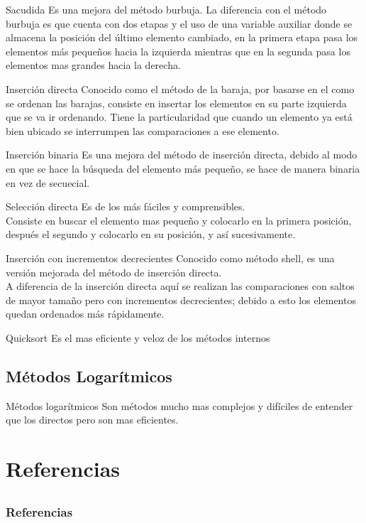 \documentclass{beamer}
\begin{document}
\begin{frame}{Sacudida}
	Es una mejora del m\'etodo burbuja. La diferencia con el m\'etodo burbuja es que cuenta con dos etapas y el uso de una variable auxiliar donde se almacena la posici\'on 
	del \'ultimo elemento cambiado, en la primera etapa pasa los elementos m\'as pequeños hacia
	la izquierda mientras que en la segunda pasa los elementos mas grandes hacia la derecha. 
\end{frame}

\begin{frame}{Inserci\'on directa}
	Conocido como el m\'etodo de la baraja, por basarse en el como se ordenan las barajas, consiste en insertar los elementos en su parte izquierda que se va ir ordenando.
	Tiene la particularidad que cuando un elemento ya est\'a bien ubicado se interrumpen las comparaciones a ese elemento.
\end{frame}

\begin{frame}{Inserci\'on binaria}
	Es una mejora del m\'etodo de inserci\'on directa, debido al modo en que se hace la b\'usqueda del elemento m\'as pequeño, se hace de manera binaria en vez de secuecial.
\end{frame}

\begin{frame}{Selecci\'on directa}
	Es de los m\'as f\'aciles y comprensibles.\\
	Consiste en buscar el elemento mas pequeño y colocarlo en la primera posici\'on, despu\'es el segundo y colocarlo en su posici\'on, y as\'i sucesivamente.
\end{frame}

\begin{frame}{Inserci\'on con incrementos decrecientes}
	Conocido como m\'etodo shell, es una versi\'on mejorada del m\'etodo de inserci\'on directa.\\
	A diferencia de la inserci\'on directa aqu\'i se realizan las comparaciones con saltos de mayor tamaño pero con incrementos decrecientes; debido a esto los elementos quedan ordenados m\'as r\'apidamente.
\end{frame}

\begin{frame}{Quicksort}
	Es el mas eficiente y veloz de los m\'etodos internos
\end{frame}

\subsection{M\'etodos Logar\'itmicos}
\begin{frame}{M\'etodos logar\'itmicos}
	Son m\'etodos mucho mas complejos y dif\'iciles de entender que los directos pero son mas eficientes.
\end{frame}

\section{Referencias}
\subsection{}
\begin{frame}[allowframebreaks]
	
	\frametitle{Referencias}
	
	
\end{frame}
\end{document}
